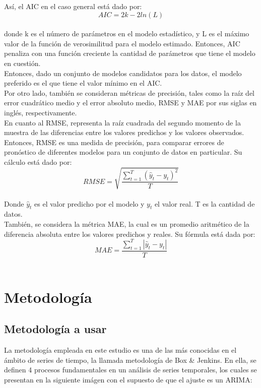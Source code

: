 \documentclass{report}
\begin{document}
Así, el AIC en el caso general está dado por:\\
\begin{equation}
    AIC=2k-2ln(L)
\end{equation}\\

donde k es el número de parámetros en el modelo estadístico, y L es el máximo valor de la función de verosimilitud para el modelo estimado. Entonces, AIC penaliza con una función creciente la cantidad de parámetros que tiene el modelo en cuestión.\\

Entonces, dado un conjunto de modelos candidatos para los datos, el modelo preferido es el que tiene el valor mínimo en el AIC.\\

Por otro lado, también se consideran métricas de precisión, tales como la raíz del error cuadrático medio y el error absoluto medio, RMSE y MAE por sus siglas en inglés, respectivamente. \\

En cuanto al RMSE, representa la raíz cuadrada del segundo momento de la muestra de las diferencias entre los valores predichos y los valores observados. Entonces, RMSE es una medida de precisión, para comparar errores de pronóstico de diferentes modelos para un conjunto de datos en particular. Su cálculo está dado por:\\
\begin{equation}
    RMSE=\sqrt{\frac{\sum_{t=1}^{T}(\hat{y}_{t}-y_{t})^{2}}{T}}
\end{equation}\\

Donde $\hat{y}_{t}$ es el valor predicho por el modelo y $y_{t}$ el valor real. T es la cantidad de datos.\\

También, se considera la métrica MAE, la cual es un promedio aritmético de la diferencia absoluta entre los valores predichos y reales. Su fórmula está dada por:\\
\begin{equation}
    MAE=\frac{\sum_{t=1}^{T}|\hat{y}_{t}-y_{t}|}{T}
\end{equation}\\


\chapter{Metodología}\label{Metodología}
\section{Metodología a usar}
La metodología empleada en este estudio es una de las más conocidas en el ámbito de series de tiempo, la llamada metodología de Box \& Jenkins. En ella, se definen 4 procesos fundamentales en un análisis de series temporales, los cuales se presentan en la siguiente imágen con el supuesto de que el ajuste es un ARIMA:\\
\end{document}
